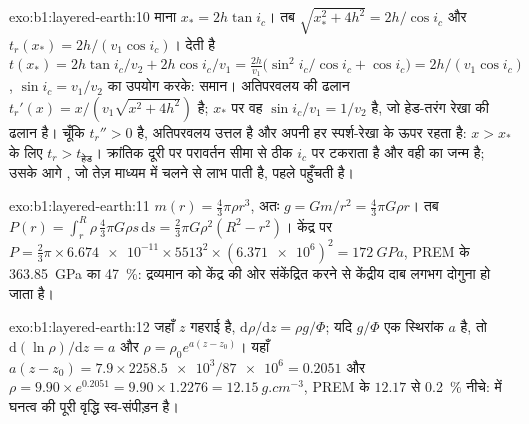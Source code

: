 \begin{solution}{exo:b1:layered-earth:10}
माना $x_* = 2h\tan i_c$। तब $\sqrt{x_*^2 + 4h^2} = 2h/\cos i_c$ और
$t_r(x_*) = 2h/(v_1\cos i_c)$।  देती है
$t(x_*) = 2h\tan i_c/v_2 + 2h\cos i_c/v_1 = \frac{2h}{v_1}\bigl(\sin^2 i_c/\cos
i_c + \cos i_c\bigr) = 2h/(v_1\cos i_c)$, $\sin i_c = v_1/v_2$ का उपयोग करके: समान। अतिपरवलय की ढलान
$t_r'(x) = x/(v_1\sqrt{x^2 + 4h^2})$ है; $x_*$ पर वह $\sin i_c/v_1 = 1/v_2$ है, जो हेड-तरंग रेखा की ढलान है। चूँकि
$t_r'' > 0$ है, अतिपरवलय उत्तल है और अपनी हर स्पर्श-रेखा के ऊपर रहता है: $x > x_*$ के लिए $t_r > t_{\text{हेड}}$। क्रांतिक
दूरी पर परावर्तन सीमा से ठीक $i_c$ पर टकराता है और वही  का जन्म है; उसके आगे , जो तेज़ माध्यम में चलने से
लाभ पाती है, पहले पहुँचती है।
\end{solution}

\begin{solution}{exo:b1:layered-earth:11}
$m(r) = \tfrac43\pi\rho r^3$, अतः $g = Gm/r^2 = \tfrac43\pi G\rho r$। तब
$P(r) = \int_r^R \rho\,\tfrac43\pi G\rho s\,\mathrm ds = \tfrac23\pi G\rho^2(R^2
- r^2)$। केंद्र पर $P = \tfrac23\pi\times\num{6.674e-11}\times5513^2\times
(\num{6.371e6})^2 = \qty{172}{GPa}$, PREM के \qty{363.85}{GPa} का \qty{47}{\percent}: द्रव्यमान को केंद्र की ओर
संकेंद्रित करने से केंद्रीय दाब लगभग दोगुना हो जाता है।
\end{solution}

\begin{solution}{exo:b1:layered-earth:12}
जहाँ $z$ गहराई है, $\mathrm d\rho/\mathrm dz = \rho g/\Phi$; यदि $g/\Phi$ एक स्थिरांक $a$ है, तो $\mathrm d(\ln\rho)/\mathrm dz = a$
और $\rho = \rho_0
e^{a(z - z_0)}$। यहाँ $a(z - z_0) = 7.9\times\num{2258.5e3}/\num{87e6} =
0.2051$ और $\rho = 9.90\times e^{0.2051} = 9.90\times1.2276 =
\qty{12.15}{g.cm^{-3}}$, PREM के $12.17$ से \qty{0.2}{\percent} नीचे:  में घनत्व की पूरी वृद्धि स्व-संपीड़न है।
\end{solution}

